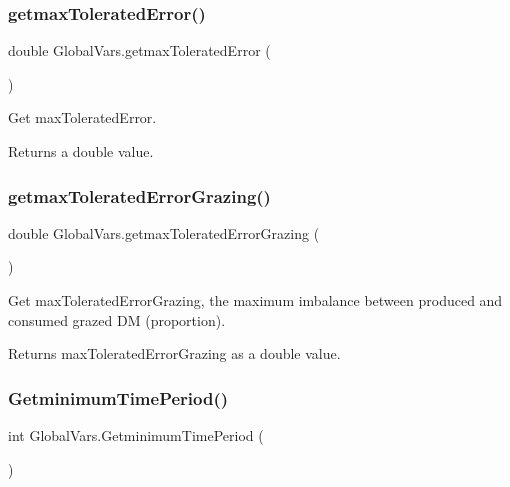 \subsubsection{\texorpdfstring{getmaxToleratedError()}{getmaxToleratedError()}}
{\footnotesize\ttfamily double Global\+Vars.\+getmax\+Tolerated\+Error (\begin{DoxyParamCaption}{ }\end{DoxyParamCaption})\hspace{0.3cm}{\ttfamily [inline]}}



Get max\+Tolerated\+Error. 

\begin{DoxyReturn}{Returns}
a double value. 
\end{DoxyReturn}
\mbox{\label{class_global_vars_a6cf904264e03e8361a2e4c45b88fdfcd}} 
\subsubsection{\texorpdfstring{getmaxToleratedErrorGrazing()}{getmaxToleratedErrorGrazing()}}
{\footnotesize\ttfamily double Global\+Vars.\+getmax\+Tolerated\+Error\+Grazing (\begin{DoxyParamCaption}{ }\end{DoxyParamCaption})\hspace{0.3cm}{\ttfamily [inline]}}



Get max\+Tolerated\+Error\+Grazing, the maximum imbalance between produced and consumed grazed DM (proportion). 

\begin{DoxyReturn}{Returns}
max\+Tolerated\+Error\+Grazing as a double value. 
\end{DoxyReturn}
\mbox{\label{class_global_vars_a05ac334d81bb66ad2ffc14bc0bd50d8f}} 
\subsubsection{\texorpdfstring{GetminimumTimePeriod()}{GetminimumTimePeriod()}}
{\footnotesize\ttfamily int Global\+Vars.\+Getminimum\+Time\+Period (\begin{DoxyParamCaption}{ }\end{DoxyParamCaption})\hspace{0.3cm}{\ttfamily [inline]}}



